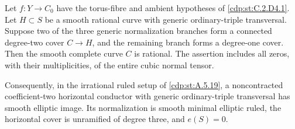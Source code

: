 
\begin{proposition}\label{cdp:st:C.2.D4.2}
Let $f:Y\to C_0$ have the torus-fibre and ambient hypotheses
of \ref{cdp:st:C.2.D4.1}. Let $H\subset S$ be a smooth rational curve
with generic ordinary-triple transversal. Suppose two of
the three generic normalization branches form a connected
degree-two cover $C\to H$, and the remaining branch forms
a degree-one cover. Then the smooth complete curve $C$
is rational. The assertion includes all zeros, with their
multiplicities, of the entire cubic normal tensor.

Consequently, in the irrational ruled setup of \ref{cdp:st:A.5.19},
a noncontracted coefficient-two horizontal conductor
with generic ordinary-triple transversal has smooth
elliptic image. Its normalization is smooth minimal
elliptic ruled, the horizontal cover is unramified of
degree three, and $e(S)=0$.
\end{proposition}
